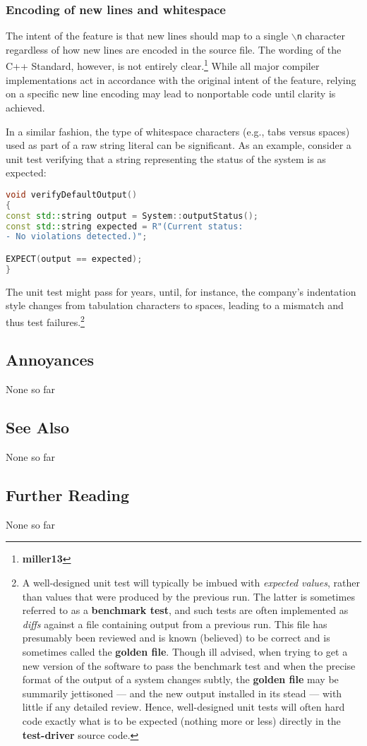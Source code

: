 \subsubsection[Encoding of new lines and whitespace]{Encoding of new lines and whitespace}\label{encoding-of-newlines-and-whitespace}

The intent of the feature is that new lines should map to a single
\texttt{$\backslash$n} character regardless of how new lines are encoded
in the source file. The wording of the C++ Standard, however, is not
entirely clear.\footnote{\textbf{miller13}} While all major compiler
implementations act in accordance with the original intent of the
feature, relying on a specific new line encoding may lead to nonportable
code until clarity is achieved.

In a similar fashion, the type of whitespace characters (e.g., tabs
versus spaces) used as part of a raw string literal can be significant.
As an example, consider a unit test verifying that a string representing
the status of the system is as expected:

\begin{lstlisting}[language=C++]
void verifyDefaultOutput()
{
const std::string output = System::outputStatus();
const std::string expected = R"(Current status:
- No violations detected.)";

EXPECT(output == expected);
}
\end{lstlisting}

\noindent The unit test might pass for years, until, for instance, the
company's indentation style changes from tabulation characters to
spaces, leading to a mismatch and thus test failures.{\cprotect\footnote{A
well-designed unit test will typically be imbued with \emph{expected
values}, rather than values that were produced by the previous run.
The latter is sometimes referred to as a \textbf{benchmark test}, and such tests are often implemented as \emph{diffs} against
a file containing output from a previous run. This file has
presumably been reviewed and is known (believed) to be correct and is sometimes called the \textbf{golden file}. Though ill advised, when trying to get a new version of the software to pass the benchmark test and when the precise format of the output of a system
changes subtly, the \textbf{golden file} may be summarily jettisoned --- and the new
output installed in its stead --- with little if any detailed review.
Hence, well-designed unit tests will often hard code exactly what is
to be expected (nothing more or less) directly in the
\textbf{test-driver} source code.}}

\subsection[Annoyances]{Annoyances}\label{annoyances}

None so far

\subsection[See Also]{See Also}\label{see-also}

None so far

\subsection[Further Reading]{Further Reading}\label{further-reading}

None so far


